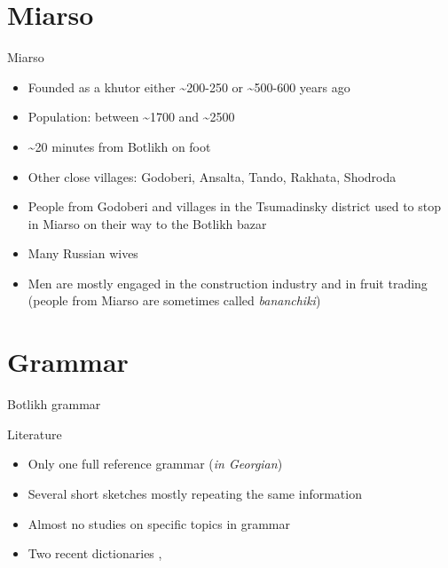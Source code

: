 \section{Miarso}
\begin{frame}{Miarso}
 \begin{itemize}
    \item Founded as a khutor either \textasciitilde{}200-250 or \textasciitilde{}500-600 years ago
    \item Population: between \textasciitilde{}1700 and \textasciitilde{}2500
    \pause
    \item \textasciitilde{}20 minutes from Botlikh on foot
    \item Other close villages: Godoberi, Ansalta, Tando, Rakhata, Shodroda
    \item People from Godoberi and villages in the Tsumadinsky district used to stop in Miarso on their way to the Botlikh bazar
    \pause
    \item Many Russian wives
    \item Men are mostly engaged in the construction industry and in fruit trading (people from Miarso are sometimes called \textit{bananchiki})
\end{itemize}   
\end{frame}


\section{Grammar}
\begin{frame}
\begin{center}
    \begin{huge} \color{darkscarlet}
    Botlikh grammar
    \end{huge}
\end{center}
\end{frame}

\begin{frame}{Literature}
\begin{itemize}
    \item Only one full reference grammar (\textit{in Georgian}) \citep{gudava1962}
    \item Several short sketches mostly repeating the same information
    \item Almost no studies on specific topics in grammar
    \item Two recent dictionaries \citep{saidovaabusov2012}, \citep{alekseev2019}
\end{itemize}
\end{frame}

